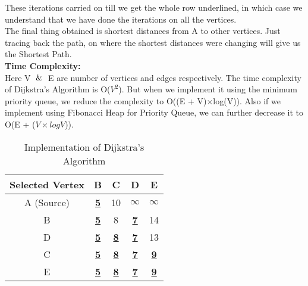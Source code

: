 \documentclass[12pt]{article}
\begin{document}
\begin{enumerate}
\begin{enumerate}[label=(\arabic*)]
 These iterations carried on till we get the whole row underlined, in which case we understand that we have done the iterations on all the vertices. \\
 
 The final thing obtained is shortest distances from A to other vertices. Just tracing back the path, on where the shortest distances were changing will give us the Shortest Path. \\
 
 \textbf{Time Complexity:} \\
 Here V $\And$ E are number of vertices and edges respectively.
 The time complexity of Dijkstra's Algorithm is O($V^2$). But when we implement it using the minimum priority queue, we reduce the complexity to O((E + V)$\times$log(V)). Also if we implement using Fibonacci Heap for Priority Queue, we can further decrease it to O(E + ($V \times logV$)).
 
 \begin{table}[]
 \begin{center}
\begin{tabular}{|c|c|c|c|c|}
\hline
Selected Vertex & B                & C                & D                & E                \\ \hline
A (Source)              & {\ul \textbf{5}} & 10               & $\infty$         & $\infty$         \\ \hline
B               & {\ul \textbf{5}} & 8                & {\ul \textbf{7}} & 14               \\ \hline
D               & {\ul \textbf{5}} & {\ul \textbf{8}} & {\ul \textbf{7}} & 13               \\ \hline
C               & {\ul \textbf{5}} & {\ul \textbf{8}} & {\ul \textbf{7}} & {\ul \textbf{9}} \\ \hline
E               & {\ul \textbf{5}} & {\ul \textbf{8}} & {\ul \textbf{7}} & {\ul \textbf{9}} \\ \hline
\end{tabular}
\caption{Implementation of Dijkstra's Algorithm}
\end{center}
\end{table}



    \end{enumerate}
    
\end{enumerate}
\end{document}
